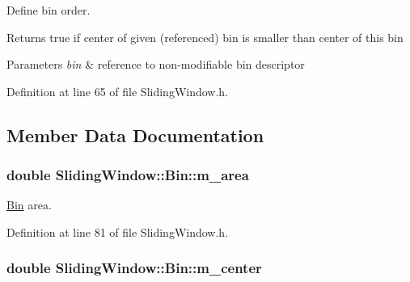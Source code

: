 Define bin order. 

\begin{DoxyReturn}{Returns}
{\ttfamily true} if center of given (referenced) bin is smaller than center of this bin
\end{DoxyReturn}

\begin{DoxyParams}{Parameters}
{\em bin} & reference to non-\/modifiable bin descriptor \\
\hline
\end{DoxyParams}


Definition at line 65 of file Sliding\+Window.\+h.



\subsection{Member Data Documentation}
\subsubsection[{\texorpdfstring{m\+\_\+area}{m_area}}]{\setlength{\rightskip}{0pt plus 5cm}double Sliding\+Window\+::\+Bin\+::m\+\_\+area\hspace{0.3cm}{\ttfamily [private]}}\hypertarget{classSlidingWindow_1_1Bin_acf2994cc62ec5cc5e3d364fdd32a8cc8}{}\label{classSlidingWindow_1_1Bin_acf2994cc62ec5cc5e3d364fdd32a8cc8}


\hyperlink{classSlidingWindow_1_1Bin}{Bin} area. 



Definition at line 81 of file Sliding\+Window.\+h.

\subsubsection[{\texorpdfstring{m\+\_\+center}{m_center}}]{\setlength{\rightskip}{0pt plus 5cm}double Sliding\+Window\+::\+Bin\+::m\+\_\+center\hspace{0.3cm}{\ttfamily [private]}}\hypertarget{classSlidingWindow_1_1Bin_a6b5b0a0ef26124b8d6a889af4f4c1b8f}{}\label{classSlidingWindow_1_1Bin_a6b5b0a0ef26124b8d6a889af4f4c1b8f}


